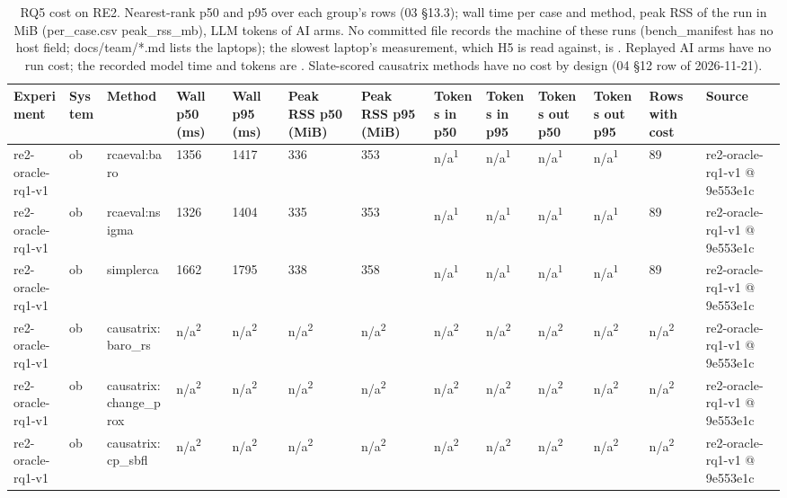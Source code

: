 \begin{table}[t]
\centering
\caption{RQ5 cost on RE2. Nearest-rank p50 and p95 over each group's rows (03 \S{}13.3); wall time per case and method, peak RSS of the run in MiB (per\_case.csv peak\_rss\_mb), LLM tokens of AI arms. No committed file records the machine of these runs (bench\_manifest has no host field; docs/team/*.md lists the laptops); the slowest laptop's measurement, which H5 is read against, is . Replayed AI arms have no run cost; the recorded model time and tokens are . Slate-scored causatrix methods have no cost by design (04 \S{}12 row of 2026-11-21).}
\label{tab:t08-rq5-cost}
\small
\begin{tabular}{lllllllllllll}
\hline
Experiment & System & Method & Wall p50 (ms) & Wall p95 (ms) & Peak RSS p50 (MiB) & Peak RSS p95 (MiB) & Tokens in p50 & Tokens in p95 & Tokens out p50 & Tokens out p95 & Rows with cost & Source \\
\hline
re2-oracle-rq1-v1 & ob & rcaeval:baro & 1356 & 1417 & 336 & 353 & n/a\textsuperscript{1} & n/a\textsuperscript{1} & n/a\textsuperscript{1} & n/a\textsuperscript{1} & 89 & re2-oracle-rq1-v1 @ 9e553e1c \\
re2-oracle-rq1-v1 & ob & rcaeval:nsigma & 1326 & 1404 & 335 & 353 & n/a\textsuperscript{1} & n/a\textsuperscript{1} & n/a\textsuperscript{1} & n/a\textsuperscript{1} & 89 & re2-oracle-rq1-v1 @ 9e553e1c \\
re2-oracle-rq1-v1 & ob & simplerca & 1662 & 1795 & 338 & 358 & n/a\textsuperscript{1} & n/a\textsuperscript{1} & n/a\textsuperscript{1} & n/a\textsuperscript{1} & 89 & re2-oracle-rq1-v1 @ 9e553e1c \\
re2-oracle-rq1-v1 & ob & causatrix:baro\_rs & n/a\textsuperscript{2} & n/a\textsuperscript{2} & n/a\textsuperscript{2} & n/a\textsuperscript{2} & n/a\textsuperscript{2} & n/a\textsuperscript{2} & n/a\textsuperscript{2} & n/a\textsuperscript{2} & n/a\textsuperscript{2} & re2-oracle-rq1-v1 @ 9e553e1c \\
re2-oracle-rq1-v1 & ob & causatrix:change\_prox & n/a\textsuperscript{2} & n/a\textsuperscript{2} & n/a\textsuperscript{2} & n/a\textsuperscript{2} & n/a\textsuperscript{2} & n/a\textsuperscript{2} & n/a\textsuperscript{2} & n/a\textsuperscript{2} & n/a\textsuperscript{2} & re2-oracle-rq1-v1 @ 9e553e1c \\
re2-oracle-rq1-v1 & ob & causatrix:cp\_sbfl & n/a\textsuperscript{2} & n/a\textsuperscript{2} & n/a\textsuperscript{2} & n/a\textsuperscript{2} & n/a\textsuperscript{2} & n/a\textsuperscript{2} & n/a\textsuperscript{2} & n/a\textsuperscript{2} & n/a\textsuperscript{2} & re2-oracle-rq1-v1 @ 9e553e1c \\

\end{tabular}
\end{table}
